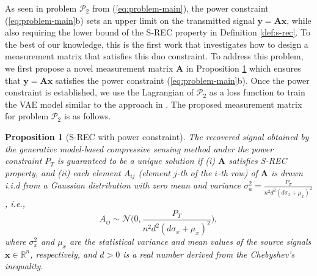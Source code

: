 \documentclass[conference, 10pt]{IEEEtran}
\newtheorem{proposition}{Proposition}
\begin{document}
As seen in problem $\mathcal{P}_2$ from (\ref{eq:problem-main}), the power constraint (\ref{eq:problem-main}b) sets an upper limit on the transmitted signal $\mathbf{y} = \mathbf{Ax}$, while also requiring the lower bound of the S-REC property in Definition \ref{def:s-rec}. To the best of our knowledge, this is the first work that investigates how to design a measurement matrix that satisfies this duo constraint. To address this problem, we first propose a novel measurement matrix $\mathbf{A}$ in Proposition \ref{prop:main} which ensures that $\mathbf{y = Ax}$ satisfies the power constraint (\ref{eq:problem-main}b). Once the power constraint is established, we use the Lagrangian of $\mathcal{P}_2$ as a loss function to train the VAE model similar to the approach in \cite{bora2017compressed, dhar2018modeling}.
The proposed measurement matrix for problem $\mathcal{P}_2$ is as follows.

\begin{proposition}[S-REC with power constraint]
The recovered signal obtained by the generative model-based compressive sensing method under the power constraint $P_T$ is guaranteed to be a unique solution if (i) $\mathbf{A}$ satisfies S-REC property, and (ii) each element $A_{ij}$ (element $j$-th of the $i$-th row) of $\mathbf{A}$ is drawn i.i.d from a Gaussian distribution with zero mean and variance $\sigma_a^2 = \frac{P_T}{n^2 d^2 (d \sigma_x + \mu_x)^2}$, i.e.,
\begin{equation*}
A_{ij} \sim \mathcal{N}\Big(0,\frac{P_T}{n^2 d^2 (d \sigma_x + \mu_x)^2}\Big),
\end{equation*}
where $\sigma_x^2$ and $\mu_x$ are the statistical variance and mean values of the source signals $\mathbf{x} \in \mathbb{R}^n$, respectively, and $d > 0$ is a real number derived from the Chebyshev's inequality.
\label{prop:main}
\end{proposition}
\end{document}

